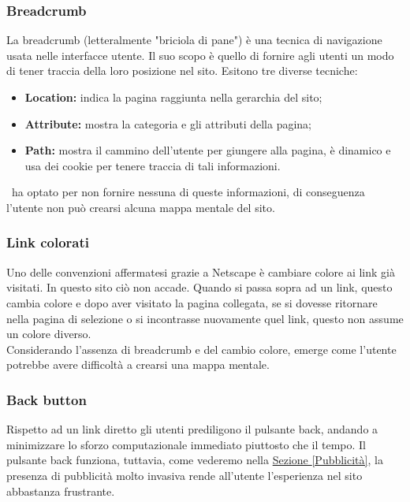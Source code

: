 \subsubsection{Breadcrumb}
La breadcrumb (letteralmente "briciola di pane") è una tecnica di navigazione usata nelle interfacce utente. Il suo scopo è quello di fornire agli utenti un modo di tener traccia della loro posizione nel sito. 
Esitono tre diverse tecniche:
\begin{itemize}
	\item \textbf{Location:} indica la pagina raggiunta nella gerarchia del sito;
	\item \textbf{Attribute:} mostra la categoria e gli attributi della pagina;
	\item \textbf{Path:} mostra il cammino dell'utente per giungere alla pagina, è dinamico e usa dei cookie per tenere traccia di tali informazioni.
\end{itemize}
\nomeSito\ ha optato per non fornire nessuna di queste informazioni, di conseguenza l'utente non può crearsi alcuna mappa mentale del sito.

\subsubsection{Link colorati}
Uno delle convenzioni affermatesi grazie a Netscape è cambiare colore ai link già visitati. In questo sito ciò non accade. Quando si passa sopra ad un link, questo cambia colore e dopo aver visitato la pagina collegata, se si dovesse ritornare nella pagina di selezione o si incontrasse nuovamente quel link, questo non assume un colore diverso. \\
Considerando l'assenza di breadcrumb e del cambio colore, emerge come l'utente potrebbe avere difficoltà a crearsi una mappa mentale.

\subsubsection{Back button}
Rispetto ad un link diretto gli utenti prediligono il pulsante back, andando a minimizzare lo sforzo computazionale immediato piuttosto che il tempo. Il pulsante back funziona, tuttavia, come vederemo nella \hyperref[Pubblicità]{Sezione \ref{Pubblicità}}, la presenza di pubblicità molto invasiva rende all'utente l'esperienza nel sito abbastanza frustrante.